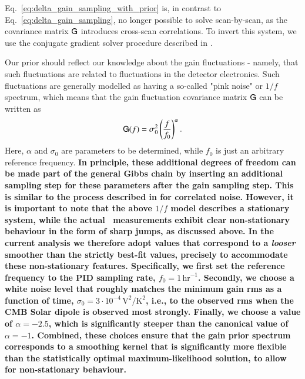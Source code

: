 \documentclass[twocolumn]{aa}
\newcommand{\tG}[0]{\tens{G}}
\begin{document}
Eq.~\eqref{eq:delta_gain_sampling_with_prior} is, in contrast to Eq.~\eqref{eq:delta_gain_sampling}, no longer possible to solve scan-by-scan, as the covariance matrix $\tG$ introduces cross-scan correlations. To invert this system, we use the conjugate gradient solver procedure described in \citet{bp01}.

Our prior should reflect our knowledge about the gain fluctuations - namely, that such fluctuations are related to fluctuations in the detector electronics. Such fluctuations are generally modelled as having a so-called "pink noise" or $1/f$ spectrum, which means that the gain fluctuation covariance matrix $\tG$ can be written as
\begin{equation}
    \tG(f) = \sigma_0^2\left(\frac{f}{f_0}\right)^\alpha.
\end{equation}
Here, $\alpha$ and $\sigma_0$ are parameters to be determined, while $f_0$ is just an arbitrary reference frequency. {\bf In principle, these additional degrees of freedom can be made part of the general Gibbs chain by inserting an additional sampling step for these parameters after the gain sampling step. This is similar to the process described in \citet{bp06} for correlated noise. However, it is important to note that the above $1/f$ model describes a stationary system, while the actual \Planck\ measurements exhibit clear non-stationary behaviour in the form of sharp jumps, as discussed above. In the current analysis we therefore adopt values that correspond to a \emph{looser} smoother than the strictly best-fit values, precisely to accommodate these non-stationary features. Specifically, we first set the reference frequency to the PID sampling rate, $f_0 = 1\, \textrm{hr}^{-1}$. Secondly, we choose a white noise level that roughly matches the minimum gain rms as a function of time, $\sigma_0 = 3\cdot 10^{-4}\,\textrm{V}^2/\textrm{K}^2$, i.e., to the observed rms when the CMB Solar dipole is observed most strongly. Finally, we choose a value of $\alpha = -2.5$, which is significantly steeper than the canonical value of $\alpha=-1$. Combined, these choices ensure that the gain prior spectrum corresponds to a smoothing kernel that is significantly more flexible than the statistically optimal maximum-likelihood solution, to allow for non-stationary behaviour. }
\end{document}
